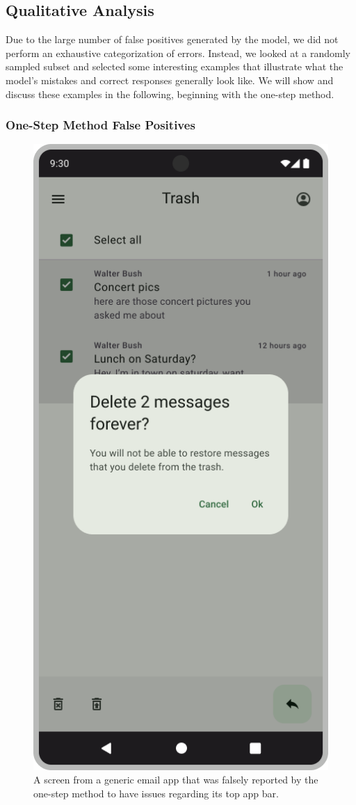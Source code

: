\documentclass[11pt,titlepage,oneside,openany]{book}
\begin{document}
\subsection{Qualitative Analysis}

Due to the large number of false positives generated by the model, we did not perform an exhaustive categorization of errors. Instead, we looked at a randomly sampled subset and selected some interesting examples that illustrate what the model's mistakes and correct responses generally look like. We will show and discuss these examples in the following, beginning with the one-step method.

\subsubsection{One-Step Method False Positives}

\begin{figure}[t]
	\centering
	\includegraphics[width=.28\textwidth]{figures/fp_ex_os_1.jpg}
	\caption{A screen from a generic email app that was falsely reported by the one-step method to have issues regarding its top app bar.}
	\label{fig:fp_ex_os_1}
\end{figure}
\end{document}

